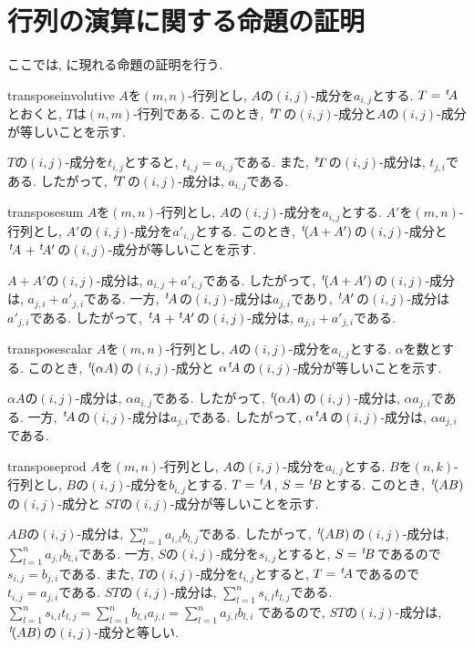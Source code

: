 \section{行列の演算に関する命題の証明}
ここでは, に現れる命題の証明を行う.

\begin{proofof*}{transpose}{involutive}
  $A$を$(m,n)$-行列とし, 
  $A$の$(i,j)$-成分を$a_{i,j}$とする.
  $T={\left.^{t}\!A\right.}$とおくと,
  $T$は$(n,m)$-行列である.
  このとき, ${\left.^{t}\!T\right.}$の$(i,j)$-成分と$A$の$(i,j)$-成分が等しいことを示す.

  $T$の$(i,j)$-成分を$t_{i,j}$とすると,
  $t_{i,j}=a_{i,j}$である.
  また,
  ${\left.^{t}\!T\right.}$の$(i,j)$-成分は, $t_{j,i}$である.
  したがって, ${\left.^{t}\!T\right.}$の$(i,j)$-成分は, $a_{i,j}$である.
\end{proofof*}
\begin{proofof*}{transpose}{sum}
  $A$を$(m,n)$-行列とし, 
  $A$の$(i,j)$-成分を$a_{i,j}$とする.
  $A'$を$(m,n)$-行列とし, 
  $A'$の$(i,j)$-成分を$a'_{i,j}$とする.
  このとき, ${\left.^{t}\!(A+A')\right.}$の$(i,j)$-成分と
  ${\left.^{t}\!A\right.}+{\left.^{t}\!A'\right.}$の$(i,j)$-成分が等しいことを示す.

  $A+A'$の$(i,j)$-成分は, $a_{i,j}+a'_{i,j}$である.
  したがって,
  ${\left.^{t}\!(A+A')\right.}$の$(i,j)$-成分は, $a_{j,i}+a'_{j,i}$である.
  一方,
  ${\left.^{t}\!A\right.}$の$(i,j)$-成分は$a_{j,i}$であり,
  ${\left.^{t}\!A'\right.}$の$(i,j)$-成分は$a'_{j,i}$である.
  したがって,
  ${\left.^{t}\!A\right.}+{\left.^{t}\!A'\right.}$の$(i,j)$-成分は, $a_{j,i}+a'_{j,i}$である.
\end{proofof*}
\begin{proofof*}{transpose}{scalar}
  $A$を$(m,n)$-行列とし, 
  $A$の$(i,j)$-成分を$a_{i,j}$とする.
  $\alpha$を数とする.
  このとき, ${\left.^{t}\!(\alpha A)\right.}$の$(i,j)$-成分と
  $\alpha{\left.^{t}\!A\right.}$の$(i,j)$-成分が等しいことを示す.

  $\alpha A$の$(i,j)$-成分は, $\alpha a_{i,j}$である.
  したがって,
  ${\left.^{t}\!(\alpha A)\right.}$の$(i,j)$-成分は, $\alpha a_{j,i}$である.
  一方,
  ${\left.^{t}\!A\right.}$の$(i,j)$-成分は$a_{j,i}$である.
  したがって,
  $\alpha {\left.^{t}\!A\right.}$の$(i,j)$-成分は, $\alpha a_{j,i}$である.
\end{proofof*}

\begin{proofof*}{transpose}{prod}
  $A$を$(m,n)$-行列とし, 
  $A$の$(i,j)$-成分を$a_{i,j}$とする.
  $B$を$(n,k)$-行列とし, 
  $B$の$(i,j)$-成分を$b_{i,j}$とする.
  $T={\left.^{t}\!A\right.}$, $S={\left.^{t}\!B\right.}$とする.
  このとき, ${\left.^{t}\!(AB)\right.}$の$(i,j)$-成分と
  $ST$の$(i,j)$-成分が等しいことを示す.

  $AB$の$(i,j)$-成分は, $\sum_{l=1}^{n} a_{i,l}b_{l,j}$である.
  したがって,
  ${\left.^{t}\!(AB)\right.}$の$(i,j)$-成分は, $\sum_{l=1}^{n} a_{j,l}b_{l,i}$である.
  一方,
  $S$の$(i,j)$-成分を$s_{i,j}$とすると,
  $S={\left.^{t}\!B\right.}$であるので
  $s_{i,j}=b_{j,i}$である.
  また, 
  $T$の$(i,j)$-成分を$t_{i,j}$とすると,
  $T={\left.^{t}\!A\right.}$であるので
  $t_{i,j}=a_{j,i}$である.
  $ST$の$(i,j)$-成分は,
  $\sum_{l=1}^{n}s_{i,l}t_{l,j}$である.
  $\sum_{l=1}^{n}s_{i,l}t_{l,j}=\sum_{l=1}^{n}b_{l,i}a_{j,l}=\sum_{l=1}^{n}a_{j,l}b_{l,i}$
  であるので,
  $ST$の$(i,j)$-成分は, ${\left.^{t}\!(AB)\right.}$の$(i,j)$-成分と等しい.
\end{proofof*}


